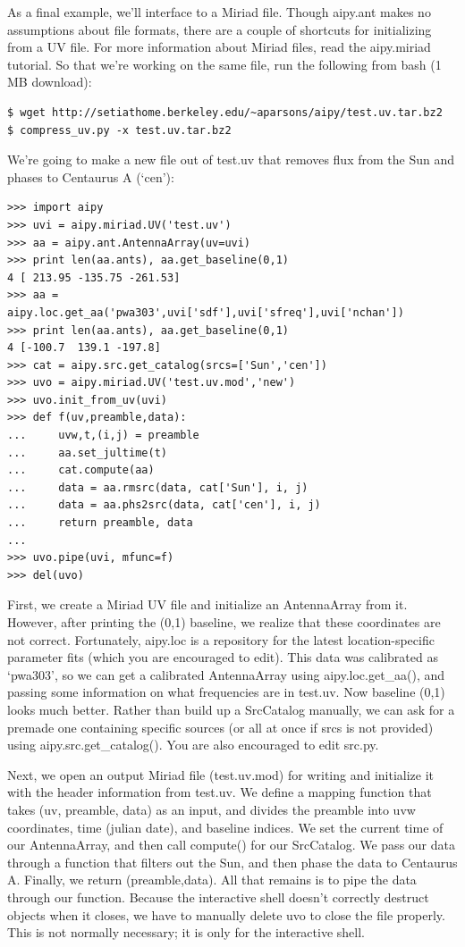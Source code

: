 As a final example, we'll interface to a Miriad file.  Though aipy.ant makes no
assumptions about file formats, there are a couple of shortcuts for
initializing from a UV file.  For more information about Miriad files, read the
aipy.miriad tutorial.  So that we're working on the same file, run the
following from bash (1 MB download):

\begin{verbatim}
$ wget http://setiathome.berkeley.edu/~aparsons/aipy/test.uv.tar.bz2
$ compress_uv.py -x test.uv.tar.bz2
\end{verbatim}

We're going to make a new file out of test.uv that removes flux from the
Sun and phases to Centaurus A (`cen'): 

\begin{verbatim}
>>> import aipy
>>> uvi = aipy.miriad.UV('test.uv')
>>> aa = aipy.ant.AntennaArray(uv=uvi)
>>> print len(aa.ants), aa.get_baseline(0,1)
4 [ 213.95 -135.75 -261.53]
>>> aa = aipy.loc.get_aa('pwa303',uvi['sdf'],uvi['sfreq'],uvi['nchan'])
>>> print len(aa.ants), aa.get_baseline(0,1)
4 [-100.7  139.1 -197.8]
>>> cat = aipy.src.get_catalog(srcs=['Sun','cen'])
>>> uvo = aipy.miriad.UV('test.uv.mod','new')
>>> uvo.init_from_uv(uvi)
>>> def f(uv,preamble,data):
...     uvw,t,(i,j) = preamble
...     aa.set_jultime(t)
...     cat.compute(aa)
...     data = aa.rmsrc(data, cat['Sun'], i, j)
...     data = aa.phs2src(data, cat['cen'], i, j)
...     return preamble, data
...
>>> uvo.pipe(uvi, mfunc=f)
>>> del(uvo)
\end{verbatim}

First, we create a Miriad UV file and initialize an AntennaArray from it.
However, after printing the (0,1) baseline, we realize that these coordinates
are not correct.  Fortunately, aipy.loc is a repository for the latest
location-specific parameter fits (which you are encouraged to edit).  This data
was calibrated as `pwa303', so we can get a calibrated AntennaArray using
aipy.loc.get\_aa(), and passing some information on what frequencies are in
test.uv.  Now baseline (0,1) looks much better.  Rather than build up a
SrcCatalog manually, we can ask for a premade one containing specific sources
(or all at once if srcs is not provided) using aipy.src.get\_catalog().  You
are also encouraged to edit src.py.

Next, we open an output Miriad file (test.uv.mod) for writing and initialize it
with the header information from test.uv.  We define a mapping function that
takes (uv, preamble, data) as an input, and divides the preamble into uvw
coordinates, time (julian date), and baseline indices.  We set the current time
of our AntennaArray, and then call compute() for our SrcCatalog.  We pass our
data through a function that filters out the Sun, and then phase the data to
Centaurus A.  Finally, we return (preamble,data).  All that remains is to pipe
the data through our function.  Because the interactive shell doesn't correctly
destruct objects when it closes, we have to manually delete uvo to close the
file properly.  This is not normally necessary; it is only for the interactive
shell.


